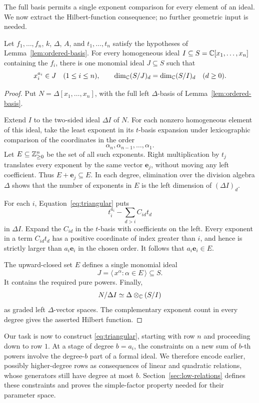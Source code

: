 The full basis permits a single exponent comparison for every element of
an ideal. We now extract the Hilbert-function consequence; no further
geometric input is needed.

\begin{proposition}\label{prop:monomial-reduction}
Let \(f_1,\ldots,f_n\), \(k\), \(\Delta\), \(A\), and
\(t_1,\ldots,t_n\) satisfy the hypotheses of
Lemma~\ref{lem:ordered-basis}. For every homogeneous ideal
\(I\subseteq S=\mathbb C[x_1,\ldots,x_n]\) containing the \(f_i\),
there is one monomial ideal \(J\subseteq S\) such that
\[
 x_i^{a_i}\in J\quad(1\le i\le n),\qquad
 \dim_\mathbb C(S/J)_d=\dim_\mathbb C(S/I)_d\quad(d\ge0).
\]
\end{proposition}

\begin{proof}
Put \(N=\Delta[x_1,\ldots,x_n]\), with the full left
\(\Delta\)-basis of Lemma~\ref{lem:ordered-basis}.

Extend \(I\) to the two-sided ideal \(\Delta I\) of \(N\). For each
nonzero homogeneous element of this ideal, take the least exponent
in its \(t\)-basis expansion under lexicographic comparison of the
coordinates in the order
\[
 \alpha_n,\alpha_{n-1},\ldots,\alpha_1.
\]
Let \(E\subseteq\mathbb Z_{\ge0}^n\) be the set of all such exponents.
Right multiplication by \(t_j\) translates every exponent by the
same vector \(\mathbf e_j\), without moving any left coefficient.
Thus \(E+\mathbf e_j\subseteq E\). In each degree, elimination over
the division algebra \(\Delta\) shows that the number of exponents
in \(E\) is the left dimension of \((\Delta I)_d\).

For each \(i\), Equation~\eqref{eq:triangular} puts
\[
 t_i^{a_i}-\sum_{d>i}C_{id}t_d
\]
in \(\Delta I\). Expand the \(C_{id}\) in the \(t\)-basis with
coefficients on the left. Every exponent in a term \(C_{id}t_d\)
has a positive coordinate of index greater than \(i\), and hence is
strictly larger than \(a_i\mathbf e_i\) in the chosen order.
It follows that \(a_i\mathbf e_i\in E\).

The upward-closed set \(E\) defines a single monomial ideal
\[
 J=\langle\,x^\alpha:\alpha\in E\,\rangle\subseteq S.
\]
It contains the required pure powers. Finally,
\[
 N/\Delta I\simeq \Delta\otimes_\mathbb C(S/I)
\]
as graded left \(\Delta\)-vector spaces. The complementary exponent
count in every degree gives the asserted Hilbert function.
\end{proof}

Our task is now to construct \eqref{eq:triangular}, starting with
row \(n\) and proceeding down to row \(1\). At a stage of degree
\(b=a_i\), the constraints on a new sum of \(b\)-th powers involve
the degree-\(b\) part of a formal ideal. We therefore encode earlier,
possibly higher-degree rows as consequences of linear and quadratic
relations, whose generators still have degree at most \(b\).
Section~\ref{sec:low-relations} defines these constraints and proves
the simple-factor property needed for their parameter space.
